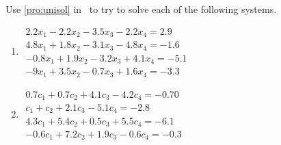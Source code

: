 \begin{exercise} \label{ex:} 
Use \autoref{pro:unisol} in \script\ to try to solve each of the following systems.
\begin{enumerate}
\item \(\begin{array}{l}
2.2x_1  -2.2x_2  -3.5x_3  -2.2x_4=   2.9\\
   4.8x_1+   1.8x_2  -3.1x_3  -4.8x_4=  -1.6\\
  -0.8x_1+   1.9x_2  -3.2x_3+   4.1x_4=  -5.1\\
  -9x_1+   3.5x_2  -0.7x_3+   1.6x_4=  -3.3\end{array}\)

\item \(\begin{array}{l}
   0.7c_1+   0.7c_2+   4.1c_3  -4.2c_4=  -0.70\\
   c_1+  c_2+  2.1c_3 -5.1c_4= -2.8\\
   4.3c_1+  5.4c_2+  0.5c_3+  5.5c_4= -6.1\\
  -0.6c_1+  7.2c_2+  1.9c_3 -0.6c_4= -0.3\end{array}\)

%
\end{enumerate}
\end{exercise}





